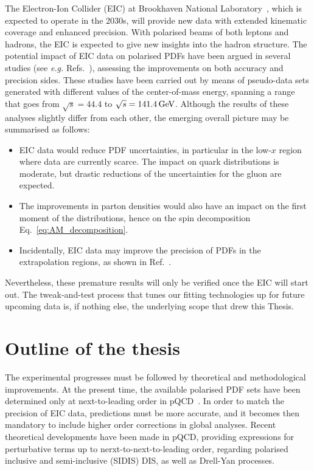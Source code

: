 The Electron-Ion Collider (EIC) at Brookhaven National Laboratory~\cite{AbdulKhalek:2021gbh}, which is expected to operate in the 2030s, will provide new data with extended kinematic coverage and enhanced precision. With polarised beams of both leptons and hadrons, the EIC is expected to give new insights into the hadron structure. The potential impact of EIC data on polarised PDFs have been argued in several studies (see \textit{e.g.} Refs.~\cite{Borsa:2020lsz, Aschenauer:2012ve, Ball:2013tyh, Aschenauer:2015ata}), assessing the improvements on both accuracy and precision sides. These studies have been carried out by means of pseudo-data sets generated with different values of the center-of-mass energy, spanning a range that goes from $\sqrt{s} = 44.4$ to $\sqrt{s} = 141.4 \,\textrm{GeV}$. Although the results of these analyses slightly differ from each other, the emerging overall picture may be summarised as follows:
%
\begin{itemize}
  \item EIC data would reduce PDF uncertainties, in particular in the low-$x$ region where data are currently scarce. The impact on quark distributions is moderate, but drastic reductions of the uncertainties for the gluon are expected.
  \item The improvements in parton densities would also have an impact on the first moment of the distributions, hence on the spin decomposition Eq.~\eqref{eq:AM_decomposition}.
  \item Incidentally, EIC data may improve the precision of PDFs in the extrapolation regions, as shown in Ref.~\cite{Ball:2013tyh}.
\end{itemize}
%
Nevertheless, these premature results will only be verified once the EIC will start out. The tweak-and-test process that tunes our fitting technologies up for future upcoming data is, if nothing else, the underlying scope that drew this Thesis.

%
\section{Outline of the thesis}

The experimental progresses must be followed by theoretical and methodological improvements. At the present time, the available polarised PDF sets have been determined only at next-to-leading order in pQCD~\cite{deFlorian:2008mr, Ethier:2017zbq, Nocera:2014gqa}. In order to match the precision of EIC data, predictions must be more accurate, and it becomes then mandatory to include higher order corrections in global analyses. Recent theoretical developments have been made in pQCD, providing expressions for perturbative terms up to nerxt-to-next-to-leading order, regarding polarised inclusive and semi-inclusive (SIDIS) DIS, as well as Drell-Yan processes.%

